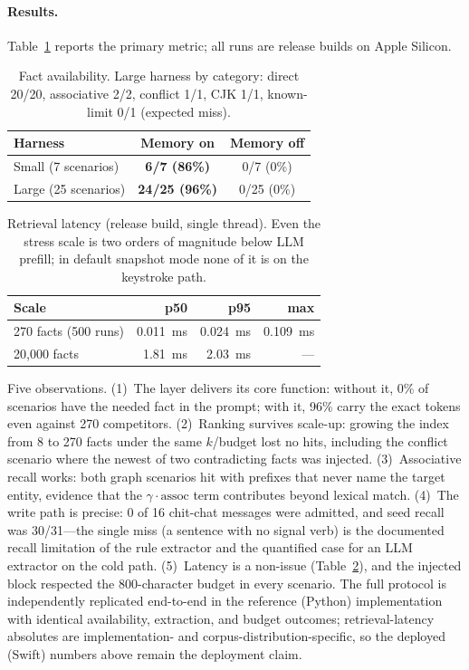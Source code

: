 \documentclass[letterpaper]{article}
\begin{document}
\paragraph{Results.}
Table~\ref{tab:availability} reports the primary metric; all runs are
release builds on Apple Silicon.

\begin{table}[t]
\centering
\small
\begin{tabular}{@{}lcc@{}}
\toprule
Harness & Memory on & Memory off \\
\midrule
Small (7 scenarios)  & \textbf{6/7 (86\%)}   & 0/7 (0\%)  \\
Large (25 scenarios) & \textbf{24/25 (96\%)} & 0/25 (0\%) \\
\bottomrule
\end{tabular}
\caption{Fact availability. Large harness by category: direct 20/20,
associative 2/2, conflict 1/1, CJK 1/1, known-limit 0/1 (expected miss).}
\label{tab:availability}
\end{table}

\begin{table}[t]
\centering
\small
\begin{tabular}{@{}lrrr@{}}
\toprule
Scale & p50 & p95 & max \\
\midrule
270 facts (500 runs) & 0.011~ms & 0.024~ms & 0.109~ms \\
20{,}000 facts       & 1.81~ms  & 2.03~ms  & --- \\
\bottomrule
\end{tabular}
\caption{Retrieval latency (release build, single thread). Even the
stress scale is two orders of magnitude below LLM prefill; in default
snapshot mode none of it is on the keystroke path.}
\label{tab:latency}
\end{table}

Five observations. (1)~The layer delivers its core function: without it,
0\% of scenarios have the needed fact in the prompt; with it, 96\% carry
the exact tokens even against 270 competitors. (2)~Ranking survives
scale-up: growing the index from 8 to 270 facts under the same
$k$/budget lost no hits, including the conflict scenario where the newest
of two contradicting facts was injected. (3)~Associative recall works:
both graph scenarios hit with prefixes that never name the target entity,
evidence that the $\gamma \cdot \mathrm{assoc}$ term contributes beyond
lexical match. (4)~The write path is precise: 0 of 16 chit-chat messages
were admitted, and seed recall was 30/31---the single miss (a sentence
with no signal verb) is the documented recall limitation of the rule
extractor and the quantified case for an LLM extractor on the cold path.
(5)~Latency is a non-issue (Table~\ref{tab:latency}), and the injected
block respected the 800-character budget in every scenario. The full
protocol is independently replicated end-to-end in the reference (Python)
implementation with identical availability, extraction, and budget
outcomes; retrieval-latency absolutes are implementation- and
corpus-distribution-specific, so the deployed (Swift) numbers above
remain the deployment claim.
\end{document}
